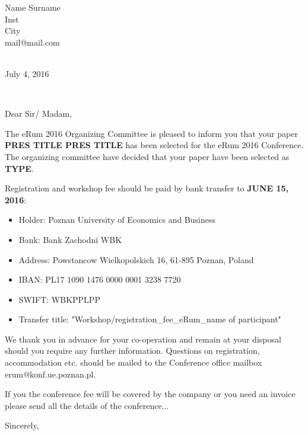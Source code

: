 \documentclass[11pt,a4paper]{letter}\usepackage[]{graphicx}\usepackage[]{color}
\def\opening#1{\thispagestyle{empty}
{\centering\fromaddress \vspace{0.6in} \\ %
\hspace*{\longindentation}July 4, 2016\hspace*{\fill}\par} %
{\raggedright \toname \\ \toaddress \par} %
\vspace{0.4in} %
\noindent #1 %
}
\begin{document}

\begin{letter} 
{Name Surname\\ 
Inst \\
City \\ 
mail@mail.com \\ 
}


\opening{Dear Sir/ Madam,}

The eRum 2016 Organizing Committee is pleased to inform you that your paper \textbf{PRES TITLE PRES TITLE } has been selected for the eRum 2016 Conference. The organizing committee have decided that your paper have been selected as \textbf{TYPE}. 

\noindent Registration and workshop fee should be paid by bank transfer to \textbf{JUNE 15, 2016}:

\begin{itemize}
\itemsep0pt
\item Holder: Poznan University of Economics and Business 
\item Bank: Bank Zachodni WBK 
\item Address: Powstancow Wielkopolskich 16, 61-895 Poznan, Poland 
\item IBAN: PL17 1090 1476 0000 0001 3238 7720 
\item SWIFT: WBKPPLPP 
\item Transfer title: "Workshop/registration\_fee\_eRum\_name of participant"
\end{itemize}

We thank you in advance for your co-operation and remain at your disposal should you require any further information. Questions on registration, accommodation etc. should be mailed to the Conference office mailbox erum@konf.ue.poznan.pl. 

If you the conference fee will be covered by the company or you need an invoice please send all the details of the conference...


\closing{Sincerely,}


\end{letter}
\end{document}

